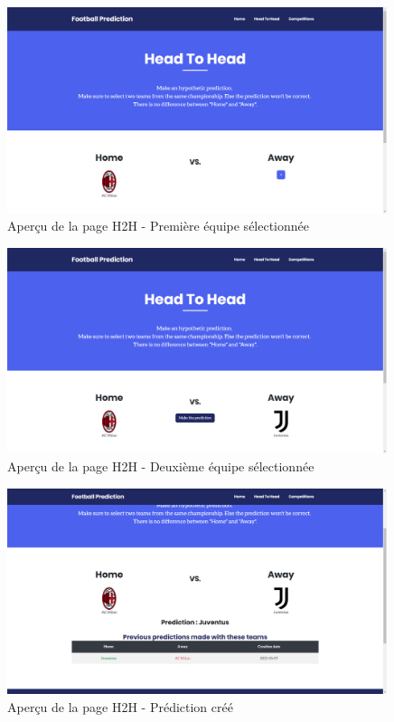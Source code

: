 \documentclass[a4paper,14pt]{extarticle}
\begin{document}
{\begin{figure}[htp]
    \centering
    \includegraphics[width=30em]{../img/teamSelectedH2H.png}
    \caption{Aperçu de la page H2H - Première équipe sélectionnée}
    \label{fig:teamSelectedH2H}
\end{figure}

\begin{figure}[htp]
    \centering
    \includegraphics[width=30em]{../img/teamsSelectedH2H.png}
    \caption{Aperçu de la page H2H - Deuxième équipe sélectionnée}
    \label{fig:teamsSelectedH2H}
\end{figure}

\begin{figure}[htp]
    \centering
    \includegraphics[width=30em]{../img/predictionMadeH2H.png}
    \caption{Aperçu de la page H2H - Prédiction créé}
    \label{fig:predictionMadeH2H}
\end{figure}

}
\end{document}
